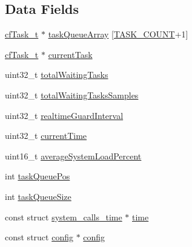 \subsection*{Data Fields}
\begin{DoxyCompactItemize}
\item 
\hyperlink{ninja__sched_8h_a437fb465244194758a669cedf9d4dbba}{cf\+Task\+\_\+t} $\ast$ \hyperlink{structninja__sched_a197b11572c0da997209ae59c64596348}{task\+Queue\+Array} \mbox{[}\hyperlink{ninja__sched_8h_a7a0ac93d52343c754e212d32d89251bda91535596df4c19a73c0aaad08784fc3b}{T\+A\+S\+K\+\_\+\+C\+O\+U\+N\+T}+1\mbox{]}
\item 
\hyperlink{ninja__sched_8h_a437fb465244194758a669cedf9d4dbba}{cf\+Task\+\_\+t} $\ast$ \hyperlink{structninja__sched_a61503437539b592233656df84e06cf34}{current\+Task}
\item 
uint32\+\_\+t \hyperlink{structninja__sched_a13ede91825cad62d094cdf092b50e4b5}{total\+Waiting\+Tasks}
\item 
uint32\+\_\+t \hyperlink{structninja__sched_a235aba2548221dbf76f7037515806aa3}{total\+Waiting\+Tasks\+Samples}
\item 
uint32\+\_\+t \hyperlink{structninja__sched_a43d3b0bfb4c15319453588f044695c17}{realtime\+Guard\+Interval}
\item 
uint32\+\_\+t \hyperlink{structninja__sched_ae954a7baf1898a5a15ce32c6cf525a50}{current\+Time}
\item 
uint16\+\_\+t \hyperlink{structninja__sched_a06111761deb72df115c42fb91c0a912e}{average\+System\+Load\+Percent}
\item 
int \hyperlink{structninja__sched_ae969712ba70cccb8f8189b8119e4b8fb}{task\+Queue\+Pos}
\item 
int \hyperlink{structninja__sched_a2b524ab94a720ed9d95e70233fc29a8e}{task\+Queue\+Size}
\item 
const struct \hyperlink{structsystem__calls__time}{system\+\_\+calls\+\_\+time} $\ast$ \hyperlink{structninja__sched_a87ba766cdff47a3bc7b8452e91103b33}{time}
\item 
const struct \hyperlink{structconfig}{config} $\ast$ \hyperlink{structninja__sched_abf477daa3f31be2ba829556bc934ab23}{config}
\end{DoxyCompactItemize}


